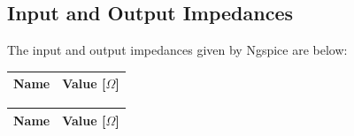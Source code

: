 \subsection{Input and Output Impedances}
The input and output impedances given by Ngspice are below: 

\begin{table}[H]
  \centering
  \begin{tabular}{|l|r|}
    \hline    
    {\bf Name} & {\bf Value [$\Omega$]} \\ \hline
    
  \end{tabular}
  \label{tab:inimpedance}
\end{table}

\begin{table}[H]
  \centering
  \begin{tabular}{|l|r|}
    \hline    
   {\bf Name} & {\bf Value [$\Omega$]} \\ \hline
    
  \end{tabular}
  \label{tab:outimpedance}
\end{table}

